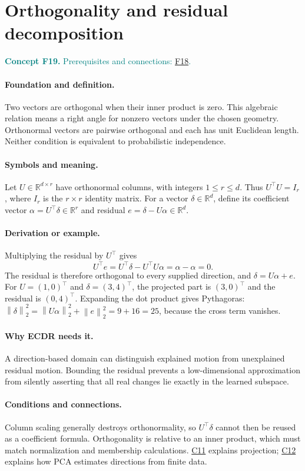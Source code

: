 \documentclass[11pt,a4paper]{article}
\newcommand{\R}{\mathbb R}
\newcommand{\norm}[1]{\left\lVert#1\right\rVert}
\newcommand{\conceptid}{Front matter}
\newcommand{\concept}[3]{\clearpage\renewcommand{\conceptid}{#1}%
\section{#2}\label{concept:#1}%
\textcolor{teal}{\textbf{Concept #1.} Prerequisites and connections: #3.}\par
\typeout{ECDR-CONCEPT-START #1 PAGE=\thepage}}
\begin{document}
\concept{F19}{Orthogonality and residual decomposition}{\hyperref[concept:F18]{F18}}
\paragraph{Foundation and definition.}
Two vectors are orthogonal when their inner product is zero. This
algebraic relation means a right angle for nonzero vectors under the
chosen geometry. Orthonormal vectors are pairwise orthogonal and each
has unit Euclidean length. Neither condition is equivalent to
probabilistic independence.
\paragraph{Symbols and meaning.}
Let $U\in\R^{d\times r}$ have orthonormal columns, with integers
$1\le r\le d$. Thus $U^\top U=I_r$, where $I_r$ is the
$r\times r$ identity matrix. For a vector $\delta\in\R^d$, define
its coefficient vector $\alpha=U^\top\delta\in\R^r$ and residual
$e=\delta-U\alpha\in\R^d$.
\paragraph{Derivation or example.}
Multiplying the residual by $U^\top$ gives
\[
 U^\top e=U^\top\delta-U^\top U\alpha
 =\alpha-\alpha=0.
\]
The residual is therefore orthogonal to every supplied direction, and
$\delta=U\alpha+e$. For $U=(1,0)^\top$ and $\delta=(3,4)^\top$,
the projected part is $(3,0)^\top$ and the residual is $(0,4)^\top$.
Expanding the dot product gives Pythagoras:
$\norm{\delta}_2^2=\norm{U\alpha}_2^2+\norm{e}_2^2=9+16=25$,
because the cross term vanishes.
\paragraph{Why ECDR needs it.}
A direction-based domain can distinguish explained motion from
unexplained residual motion. Bounding the residual prevents a
low-dimensional approximation from silently asserting that all real
changes lie exactly in the learned subspace.
\paragraph{Conditions and connections.}
Column scaling generally destroys orthonormality, so $U^\top\delta$
cannot then be reused as a coefficient formula. Orthogonality is relative
to an inner product, which must match normalization and membership
calculations. \hyperref[concept:C11]{C11} explains projection; \hyperref[concept:C12]{C12} explains how PCA estimates
directions from finite data.
\par\label{endconcept:F19}
\end{document}
